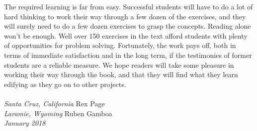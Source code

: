 The required learning is far from easy.
Successful students will have to do a lot of hard thinking
to work their way through a few dozen of the exercises,
and they will surely need to do a few dozen exercises to grasp the concepts.
Reading alone won't be enough.
Well over 150 exercises in the text afford students with plenty of opportunities
for problem solving.
Fortunately, the work pays off, both in terms of immediate satisfaction
and in the long term, if the testimonies of former students are a
reliable measure.
We hope readers will take some pleasure in working their way through
the book, and that they will find what they learn
edifying as they go on to other projects.
\\
\\
\emph{Santa Cruz, California}   \hfill Rex Page \\
\emph{Laramie, Wyoming}         \hfill Ruben Gamboa \\
\emph{January 2018}


